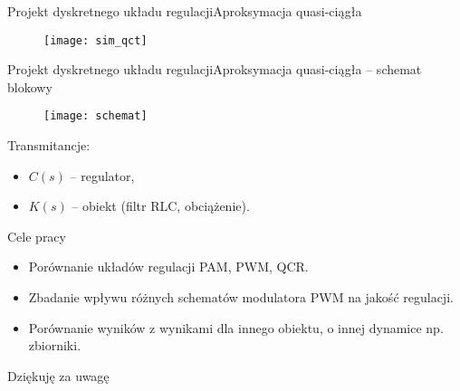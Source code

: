 \documentclass[11pt]{beamer}
\begin{document}
\begin{frame}{Projekt dyskretnego układu regulacji}{Aproksymacja quasi-ciągła}

\begin{figure}[htbp!]
	\centering
	\texttt{[image: sim\_qct]}
\end{figure}

\end{frame}


\begin{frame}{Projekt dyskretnego układu regulacji}{Aproksymacja quasi-ciągła -- schemat blokowy}

\begin{figure}[htbp!]
	\centering
	\texttt{[image: schemat]}
\end{figure}

\vspace{0.5cm}

Transmitancje:
\begin{itemize}
\item $C(s)$ -- regulator,
\item $K(s)$ -- obiekt (filtr RLC, obciążenie).
\end{itemize}

\end{frame}


\begin{frame}{Cele pracy}

\begin{itemize}
\item Porównanie układów regulacji PAM, PWM, QCR.
\item Zbadanie wpływu różnych schematów modulatora PWM na jakość regulacji.
\item Porównanie wyników z wynikami dla innego obiektu, o innej dynamice np. zbiorniki.
\end{itemize}

\end{frame}



\begin{frame}
\begin{center}
\LARGE Dziękuję za uwagę
\end{center}
\end{frame}
\end{document}
